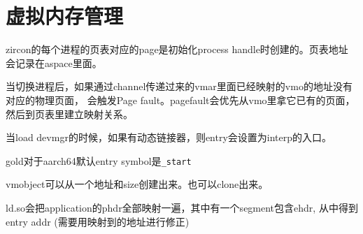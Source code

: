 \section{虚拟内存管理}
zircon的每个进程的页表对应的page是初始化process handle时创建的。页表地址
会记录在aspace里面。

当切换进程后，如果通过channel传递过来的vmar里面已经映射的vmo的地址没有对应的物理页面，
会触发Page fault。pagefault会优先从vmo里拿它已有的页面，然后到页表里建立映射关系。

当load devmgr的时候，如果有动态链接器，则entry会设置为interp的入口。

gold对于aarch64默认entry symbol是\verb|_start|

vmobject可以从一个地址和size创建出来。也可以clone出来。

ld.so会把application的phdr全部映射一遍，其中有一个segment包含ehdr, 从中得到entry addr (需要用映射到的地址进行修正)